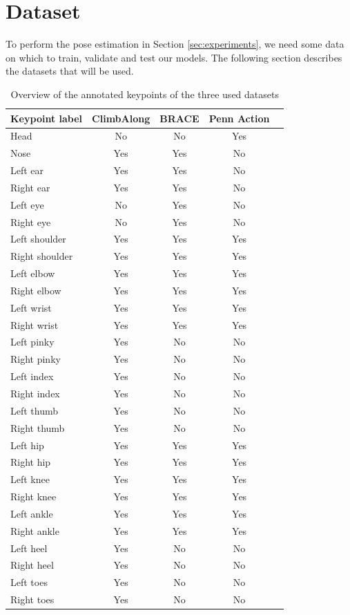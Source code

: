 \documentclass[./main.tex]{subfiles}
\begin{document}
\section{Dataset}
To perform the pose estimation in Section \ref{sec:experiments}, we need some data on which to train, validate and test our models. The following section describes the datasets that will be used.

\begin{table}[htbp]
    \begin{tabular}{|l|c|c|c|c|}
        \hline
        \textbf{Keypoint label} & \textbf{ClimbAlong} & \textbf{BRACE} & \textbf{Penn Action} \\ \hline
        Head & No & No & Yes \\ \hline
        Nose & Yes & Yes & No \\ \hline
        Left ear & Yes & Yes & No \\ \hline
        Right ear & Yes & Yes & No \\ \hline
        Left eye & No & Yes & No \\ \hline
        Right eye & No & Yes & No \\ \hline
        Left shoulder & Yes & Yes & Yes \\ \hline
        Right shoulder & Yes & Yes & Yes \\ \hline
        Left elbow & Yes & Yes & Yes \\ \hline
        Right elbow & Yes & Yes & Yes \\ \hline
        Left wrist & Yes & Yes & Yes \\ \hline
        Right wrist & Yes & Yes & Yes \\ \hline
        Left pinky & Yes & No & No \\ \hline
        Right pinky & Yes & No & No \\ \hline
        Left index & Yes & No & No \\ \hline
        Right index & Yes & No & No \\ \hline
        Left thumb & Yes & No & No \\ \hline
        Right thumb & Yes & No & No \\ \hline
        Left hip & Yes & Yes & Yes \\ \hline
        Right hip & Yes & Yes & Yes \\ \hline
        Left knee & Yes & Yes & Yes \\ \hline
        Right knee & Yes & Yes & Yes \\ \hline
        Left ankle & Yes & Yes & Yes \\ \hline
        Right ankle & Yes & Yes & Yes \\ \hline
        Left heel & Yes & No & No \\ \hline
        Right heel & Yes & No & No \\ \hline
        Left toes & Yes & No & No \\ \hline
        Right toes & Yes & No & No \\ \hline
    \end{tabular}
    \caption{Overview of the annotated keypoints of the three used datasets}
    \label{tab:keypoints}
\end{table}
\end{document}
